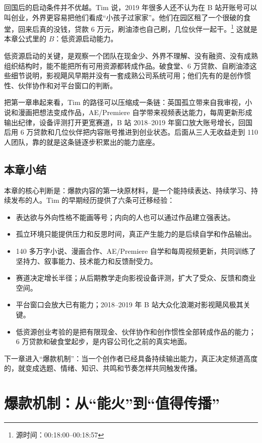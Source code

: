 \documentclass[a4paper]{article}
\begin{document}
回国后的启动条件并不优越。Tim 说，2019 年很多人还不认为在 B 站开账号可以叫创业，外界更容易把他们看成“小孩子过家家”。他们在园区租了一个很破的食堂，回来后真的没钱，贷款 6 万元，刷油漆也自己刷，几位伙伴一起干。\footnote{源时间：00:18:00--00:18:57} 这就是本章公式里的 $B$：低资源启动能力。

低资源启动的关键，是观察一个团队在现金少、外界不理解、没有融资、没有成熟组织结构时，能不能把所有可用资源都转成作品。破食堂、6 万贷款、自刷油漆这些细节说明，影视飓风早期并没有一套成熟公司系统可用；他们先有的是创作惯性、伙伴协作和对平台窗口的判断。

把第一章串起来看，Tim 的路径可以压缩成一条链：英国孤立带来自我审视，小说和漫画把想法变成作品，AE/Premiere 自学带来视频表达能力，每周更新形成输出纪律，设备评测打开更宽赛道，B 站 2018--2019 年窗口放大账号增长，回国后用 6 万贷款和几位伙伴把内容账号推进到创业状态。后面从三人无收益走到 110 人团队，靠的就是这条链逐步积累出的能力底座。

\subsection{本章小结}

本章的核心判断是：爆款内容的第一块原材料，是一个能持续表达、持续学习、持续发布的人。Tim 的早期经历提供了六条可迁移经验：

\begin{itemize}
  \item 表达欲与外向性格不能画等号；内向的人也可以通过作品建立强表达。
  \item 孤立环境只能提供压力和反思时间，真正产生能力的是后续自学和作品输出。
  \item 140 多万字小说、漫画合作、AE/Premiere 自学和每周视频更新，共同训练了坚持力、叙事能力、技术能力和反馈耐受力。
  \item 赛道决定增长半径；从后期教学走向影视设备评测，扩大了受众、反馈和商业空间。
  \item 平台窗口会放大已有能力；2018--2019 年 B 站大众化浪潮对影视飓风极其关键。
  \item 低资源创业考验的是把有限现金、伙伴协作和创作惯性全部转成作品的能力；6 万贷款和破食堂起步，是内容公司化之前的真实地面。
\end{itemize}

下一章进入“爆款机制”：当一个创作者已经具备持续输出能力，真正决定频道高度的，就变成选题、情绪、知识、共鸣和节奏怎样共同触发传播。
\section{爆款机制：从“能火”到“值得传播”}
\end{document}
